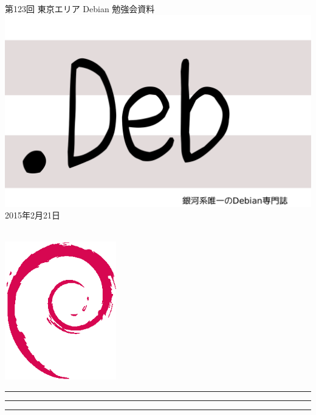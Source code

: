 \documentclass[mingoth,a4paper]{jsarticle}
\newcommand{\debmtgyear}{2015}
\newcommand{\debmtgmonth}{2}
\newcommand{\debmtgdate}{21}
\newcommand{\debmtgnumber}{123}
\begin{document}
\begin{titlepage}
\thispagestyle{empty}

\vspace*{-2cm}
第\debmtgnumber{}回 東京エリア Debian 勉強会資料\\
\hspace*{-2cm}
\includegraphics{image2012-natsu/dotdeb.pdf}\\
\hfill{}\debmtgyear{}年\debmtgmonth{}月\debmtgdate{}日

\\

\vspace*{-2cm}
\hfill{}\includegraphics[height=6cm]{image200502/openlogo-nd.eps}
\end{titlepage}

\newpage

\begin{minipage}[b]{0.2\hsize}
 \colorbox{titleback}{}
\end{minipage}
\begin{minipage}[b]{0.8\hsize}
\hrule
\vspace{2mm}
\hrule
\begin{multicols}{2}
\tableofcontents
\end{multicols}
\vspace{2mm}
\hrule
\end{minipage}
\end{document}
